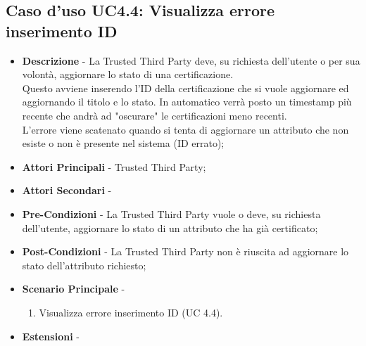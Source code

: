 \subsection{Caso d'uso UC4.4: Visualizza errore inserimento ID}
\begin{itemize}
	\item \textbf{Descrizione} - La Trusted Third Party deve, su richiesta dell'utente o per sua volontà, aggiornare lo stato di una certificazione.\\
	Questo avviene inserendo l'ID della certificazione che si vuole aggiornare ed aggiornando il titolo e lo stato. In automatico verrà posto un timestamp più recente che andrà ad "oscurare" le certificazioni meno recenti.\\
	L'errore viene scatenato quando si tenta di aggiornare un attributo che non esiste o non è presente nel sistema (ID errato);
	\item \textbf{Attori Principali} - Trusted Third Party;
	\item \textbf{Attori Secondari} -
	\item \textbf{Pre-Condizioni} - La Trusted Third Party vuole o deve, su richiesta dell'utente, aggiornare lo stato di un attributo che ha già certificato;
	\item \textbf{Post-Condizioni} - La Trusted Third Party non è riuscita ad aggiornare lo stato dell'attributo richiesto;
	\item \textbf{Scenario Principale} -
	\begin{enumerate}
		\item Visualizza errore inserimento ID (UC 4.4).
	\end{enumerate}
	\item \textbf{Estensioni} -
\end{itemize}
\newpage
